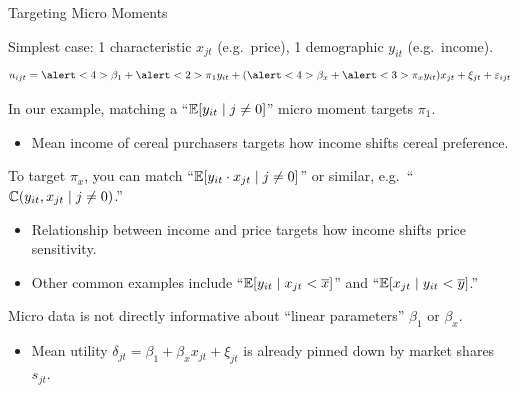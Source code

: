 \documentclass[aspectratio=169,t,11pt,table]{beamer}
\begin{document}
\begin{frame}{Targeting Micro Moments}
    \begin{wideitemize}
        \item Simplest case: 1 characteristic $x_{jt}$ (e.g.\ price), 1 demographic $y_{it}$ (e.g.\ income).
        \begin{equation*}
            u_{ijt} = \alert<4>{\beta_1} + \alert<2>{\pi_1} y_{it} + (\alert<4>{\beta_x} + \alert<3>{\pi_x} y_{it}) x_{jt} + \xi_{jt} + \varepsilon_{ijt} 
        \end{equation*}
        \vspace{-1.5\baselineskip}
        \pause
        \item In our example, matching a ``$\mathbb{E}[y_{it} \mid j \neq 0]$'' micro moment targets \alert<2>{$\pi_1$}.
        \begin{itemize}
            \item Mean income of cereal purchasers targets how income shifts cereal preference.
        \end{itemize}
        \pause
        \item To target \alert<3>{$\pi_x$}, you can match ``$\mathbb{E}[y_{it} \cdot x_{jt} \mid j \neq 0]$'' or similar, e.g.\ ``$\mathbb{C}(y_{it}, x_{jt} \mid j \neq 0)$.''
        \begin{itemize}
            \item Relationship between income and price targets how income shifts price sensitivity.
            \item Other common examples include ``$\mathbb{E}[y_{it} \mid x_{jt} < \overline{x}]$'' and ``$\mathbb{E}[x_{jt} \mid y_{it} < \overline{y}]$.''
        \end{itemize}
        \pause
        \item Micro data is not directly informative about ``linear parameters'' \alert<4>{$\beta_1$} or \alert<4>{$\beta_x$}.
        \begin{itemize}
            \item Mean utility $\delta_{jt} = \beta_1 + \beta_x x_{jt} + \xi_{jt}$ is already pinned down by market shares $s_{jt}$.
        \end{itemize}
    \end{wideitemize}
\end{frame}
\end{document}
